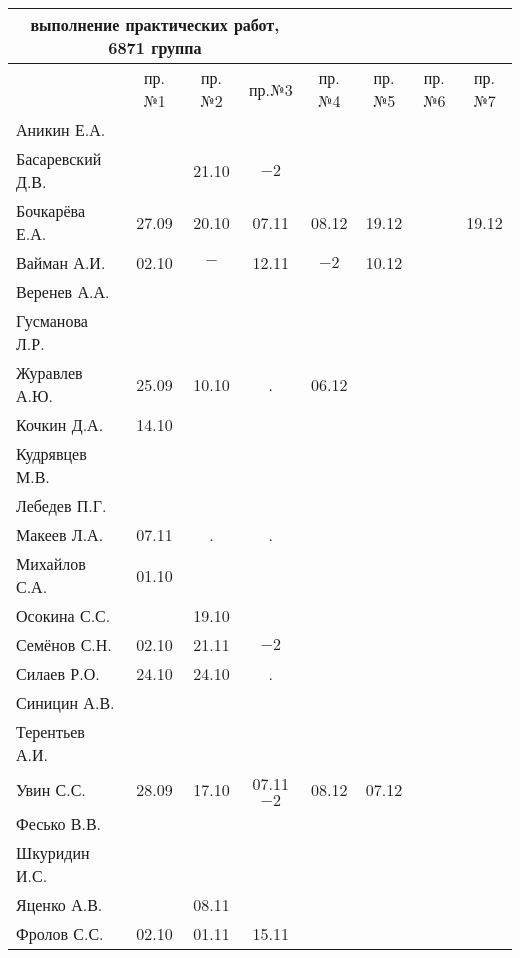 \documentclass[a4paper,landscape,11pt]{article}
\begin{document}
\begin{tabular}{l|ccccccc}
\multicolumn{4}{c}{выполнение практических работ, 6871 группа} \\
\toprule
		&пр.№1&пр.№2&пр.№3&пр.№4&пр.№5&  пр.№6& пр.№7\\
\midrule
	Аникин Е.А.     &     &     &     &     &     &&\\    
	Басаревский Д.В.&     &21.10& $-2$&     &     &&\\
	Бочкарёва Е.А.  &27.09&20.10&07.11&08.12&19.12&&19.12\\
	Вайман А.И.     &02.10&$-$  &12.11& $-2$&10.12&&\\
	Веренев А.А.    &     &     &     &     &     &&\\
	Гусманова Л.Р.  &     &     &     &     &     &&\\
	Журавлев А.Ю.   &25.09&10.10&  .  &06.12&     &&\\
	Кочкин Д.А.     &14.10&     &     &     &     &&\\
	Кудрявцев М.В.  &     &     &     &     &     &&\\
	Лебедев П.Г.    &     &     &     &     &     &&\\
	Макеев Л.А.     &07.11&  .  &  .  &     &     &&\\
	Михайлов С.А.   &01.10&     &     &     &     &&\\
	Осокина С.С.    &     &19.10&     &     &     &&\\
	Семёнов С.Н.    &02.10&21.11&$-2 $&     &     &&\\
	Силаев Р.О.     &24.10&24.10&  .  &     &     &&\\
	Синицин А.В.    &     &     &     &     &     &&\\
	Терентьев А.И.  &     &     &     &     &     &&\\
	Увин С.С.       &28.09&17.10&07.11$-2$&08.12&07.12&&\\
	Фесько В.В.     &     &     &     &     &     &&\\
	Шкуридин И.С.   &     &     &     &     &     &&\\
	Яценко А.В.     &     &08.11&     &     &     &&\\
	Фролов С.С.     &02.10&01.11&15.11&     &     &&\\
\bottomrule
\end{tabular}
\end{document}
